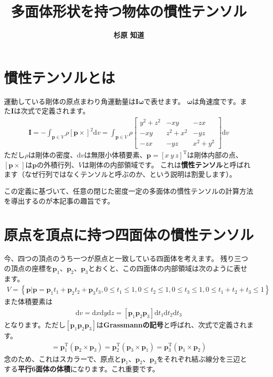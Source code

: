 \documentclass{jsarticle}
\title{\bf 多面体形状を持つ物体の慣性テンソル}
\author{\Large{\bf 杉原 知道}}
\begin{document}
\maketitle

\section{慣性テンソルとは}

運動している剛体の原点まわり角運動量は$\boldsymbol{I}\boldsymbol{\omega}$で表せます。
$\boldsymbol{\omega}$は角速度です。また$\boldsymbol{I}$は次式で定義されます。
\begin{align*}
\boldsymbol{I}
=-\int_{\boldsymbol{p}\in V}\rho[\boldsymbol{p}\times]^{2}\mathrm{d}v
=\int_{\boldsymbol{p}\in V}\rho\left[\begin{array}{ccc}
 y^2+z^2 & -xy & -zx \\
 -xy & z^2+x^2 & -yz \\
 -zx & -yz & x^2+y^2
\end{array}\right]\mathrm{d}v
\end{align*}
ただし$\rho$は剛体の密度、$\mathrm{d}v$は無限小体積要素、$\boldsymbol{p}=[x~y~z]^{\mathrm{T}}$は剛体内部の点、$[\boldsymbol{p}\times]$は$\boldsymbol{p}$の外積行列、$V$は剛体の内部領域です。
これは{\bf 慣性テンソル}と呼ばれます（なぜ行列ではなくテンソルと呼ぶのか、という説明は割愛します）。

この定義に基づいて、任意の閉じた密度一定の多面体の慣性テンソルの計算方法を導出するのが本記事の趣旨です。

\section{原点を頂点に持つ四面体の慣性テンソル}

今、四つの頂点のうち一つが原点と一致している四面体を考えます。
残り三つの頂点の座標を$\boldsymbol{p}_{1}$、$\boldsymbol{p}_{2}$、$\boldsymbol{p}_{3}$とおくと、この四面体の内部領域は次のように表せます。
\begin{align*}
V=\left\{\boldsymbol{p}|\boldsymbol{p}=\boldsymbol{p}_{1}t_{1}+\boldsymbol{p}_{2}t_{2}+\boldsymbol{p}_{3}t_{3}, 0\leq t_{1}\leq 1, 0\leq t_{2}\leq 1, 0\leq t_{3}\leq 1, 0\leq t_{1}+t_{2}+t_{3}\leq 1 \right\}
\end{align*}
また体積要素は
\begin{align*}
\mathrm{d}v=\mathrm{d}x\mathrm{d}y\mathrm{d}z=[\boldsymbol{p}_{1} \boldsymbol{p}_{2} \boldsymbol{p}_{3}]\mathrm{d}t_{1}\mathrm{d}t_{2}\mathrm{d}t_{3}
\end{align*}
となります。ただし$[\boldsymbol{p}_{1} \boldsymbol{p}_{2} \boldsymbol{p}_{3}]$は{\bf Grassmannの記号}と呼ばれ、次式で定義されます。
\begin{align*}
[\boldsymbol{p}_{1} \boldsymbol{p}_{2} \boldsymbol{p}_{3}]
=\boldsymbol{p}_{1}^{\mathrm{T}}(\boldsymbol{p}_{2}\times\boldsymbol{p}_{3})
=\boldsymbol{p}_{2}^{\mathrm{T}}(\boldsymbol{p}_{3}\times\boldsymbol{p}_{1})
=\boldsymbol{p}_{3}^{\mathrm{T}}(\boldsymbol{p}_{1}\times\boldsymbol{p}_{2})
\end{align*}
念のため、これはスカラーで、原点と$\boldsymbol{p}_{1}$、$\boldsymbol{p}_{2}$、$\boldsymbol{p}_{3}$をそれぞれ結ぶ線分を三辺とする{\bf 平行6面体の体積}になります。これ重要です。
\end{document}
